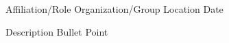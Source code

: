 

\begin{cventries}

  \cventry
    {Affiliation/Role} %
    {Organization/Group} %
    {Location} %
    {Date} %
    {
      \begin{cvitems} %
        \item {Description Bullet Point}
      \end{cvitems}
    }


\end{cventries}
